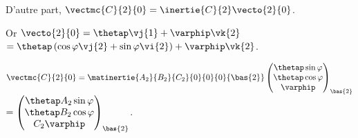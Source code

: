  D'autre part, $\vectmc{C}{2}{0} = \inertie{C}{2}\vecto{2}{0}$. 
 
 Or $\vecto{2}{0} = \thetap \vj{1} + \varphip\vk{2}$ $= \thetap \left(\cos\varphi \vj{2} + \sin\varphi \vi{2}\right) + \varphip\vk{2}$.
 
$\vectmc{C}{2}{0} = \matinertie{A_2}{B_2}{C_2}{0}{0}{0}{\bas{2}} 
 \begin{pmatrix} 
 \thetap \sin\varphi  \\
  \thetap \cos\varphi  \\
  \varphip
 \end{pmatrix}_{\bas{2}}$
 $ =  \begin{pmatrix} 
 \thetap A_2 \sin\varphi  \\
  \thetap B_2 \cos\varphi  \\
  C_ 2 \varphip
 \end{pmatrix}_{\bas{2}}$.
%  
%  


\else
\fi

\ifprof
\else
\fi


\ifcolle
{}
\else
\fi


\ifprof
\else


\fi

